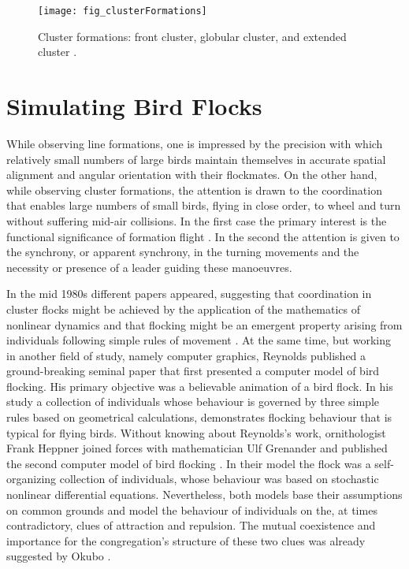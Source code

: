 \begin{figure}
  \texttt{[image: fig\_clusterFormations]}
  \caption{Cluster formations: front cluster, globular cluster, and extended cluster \cite{heppner:1974a}.}
  \label{fig:clusterFormations}
\end{figure}


\section{Simulating Bird Flocks}
While observing line formations, one is impressed by the precision with which relatively small numbers of large birds maintain themselves in accurate spatial alignment and angular orientation with their flockmates. On the other hand, while observing cluster formations, the attention is drawn to the coordination that enables large numbers of small birds, flying in close order, to wheel and turn without suffering mid-air collisions. In the first case the primary interest is the functional significance of formation flight \cite{heppner:1997,speakman:1998}. In the second the attention is given to the synchrony, or apparent synchrony, in the turning movements and the necessity or presence of a leader guiding these manoeuvres.

In the mid 1980s different papers appeared, suggesting that coordination in cluster flocks might be achieved by the application of the mathematics of nonlinear dynamics \cite{okubo:1986} and that flocking might be an emergent property arising from individuals following simple rules of movement \cite{heppner:1987}. At the same time, but working in another field of study, namely computer graphics, Reynolds \cite{reynolds:1987} published a ground-breaking seminal paper that first presented a computer model of bird flocking. His primary objective was a believable animation of a bird flock. In his study a collection of individuals whose behaviour is governed by three simple rules based on geometrical calculations, demonstrates flocking behaviour that is typical for flying birds. Without knowing about Reynolds's work, ornithologist Frank Heppner joined forces with mathematician Ulf Grenander and published the second computer model of bird flocking \cite{heppner:1990}. In their model the flock was a self-organizing collection of individuals, whose behaviour was based on stochastic nonlinear differential equations. Nevertheless, both models base their assumptions on common grounds and model the behaviour of individuals on the, at times contradictory, clues of attraction and repulsion. The mutual coexistence and importance for the congregation's structure of these two clues was already suggested by Okubo \cite{okubo:1980}.

